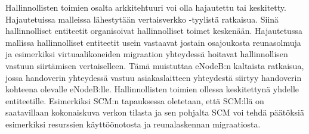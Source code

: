 Hallinnollisten toimien osalta arkkitehtuuri voi olla hajautettu tai keskitetty. 
Hajautetuissa malleissa lähestytään vertaisverkko -tyylistä ratkaisua. Siinä hallinnolliset entiteetit organisoivat hallinnolliset toimet keskenään. Hajautetussa mallissa hallinnolliset entiteetit usein vastaavat jostain osajoukosta reunasolmuja ja esimerkiksi virtuaalikoneiden migraation yhteydessä hoitavat hallinnollisen vastuun siirtämisen vertaiselleen. 
Tämä muistuttaa eNodeB:n kaltaista ratkaisua, jossa handoverin yhteydessä vastuu asiakaslaitteen yhteydestä siirtyy handoverin kohteena olevalle eNodeB:lle. 
Hallinnollisten toimien ollessa keskitettynä yhdelle entiteetille. Esimerkiksi SCM:n \cite{lobillo15scc} tapauksessa oletetaan, että SCM:llä on saatavillaan kokonaiskuva verkon tilasta ja sen pohjalta SCM voi tehdä päätöksiä esimerkiksi resurssien käyttöönotosta ja reunalaskennan migraatiosta. 

